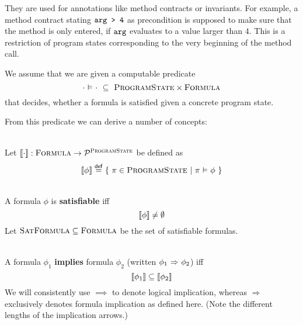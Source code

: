 \begin{description}
    They are used for annotations like method contracts or invariants.
    For example, a method contract stating $\textup{\texttt{arg > 4}}$ as precondition is supposed to make sure that the method is only entered, if $\textup{\texttt{arg}}$ evaluates to a value larger than $4$.
    This is a restriction of program states corresponding to the very beginning of the method call.
    
    We assume that we are given a computable predicate
    \begin{displaymath}
    \cdot \,\,{\vDash}\,\, \cdot ~\subseteq~ \textup{\textsc{ProgramState}} \times \textup{\textsc{Formula}}
    \end{displaymath}
    that decides, whether a formula is satisfied given a concrete program state.
    
    From this predicate we can derive a number of concepts:
    
    \begin{definition}~\\
        \label{def:frm-den-sem}
        Let $\llbracket {\cdot} \rrbracket : \textup{\textsc{Formula}} \rightarrow \mathcal{P}^{\textup{\textsc{ProgramState}}}$ be defined as
        \begin{displaymath}
        \llbracket {\phi} \rrbracket \overset{\textup{\textmd{\textsf{def}}}}{=} \{~ \pi \in \textup{\textsc{ProgramState}} ~|~ \pi \,\,{\vDash}\,\, \phi ~\}
        \end{displaymath}
    \end{definition}
        
    
    \begin{definition}~\\
        A formula $\phi$ is \textbf{satisfiable} iff $$\llbracket {\phi} \rrbracket \neq \emptyset$$
        Let $\textup{\textsc{SatFormula}} \subseteq \textup{\textsc{Formula}}$ be the set of satisfiable formulas.
    \end{definition}
    
    \begin{definition}~\\
        \label{def:form-implication}
        A formula $\phi_1$ \textbf{implies} formula $\phi_2$ (written ${\phi_1} \,\,{\Rightarrow}\,\, {\phi_2}$) iff
        \begin{displaymath}
        \llbracket {\phi_1} \rrbracket \subseteq \llbracket {\phi_2} \rrbracket
        \end{displaymath}
        We will consistently use $\implies$ to denote logical implication, whereas $\Rightarrow$ exclusively denotes formula implication as defined here.
        (Note the different lengths of the implication arrows.)
    \end{definition}
    

\end{description}
